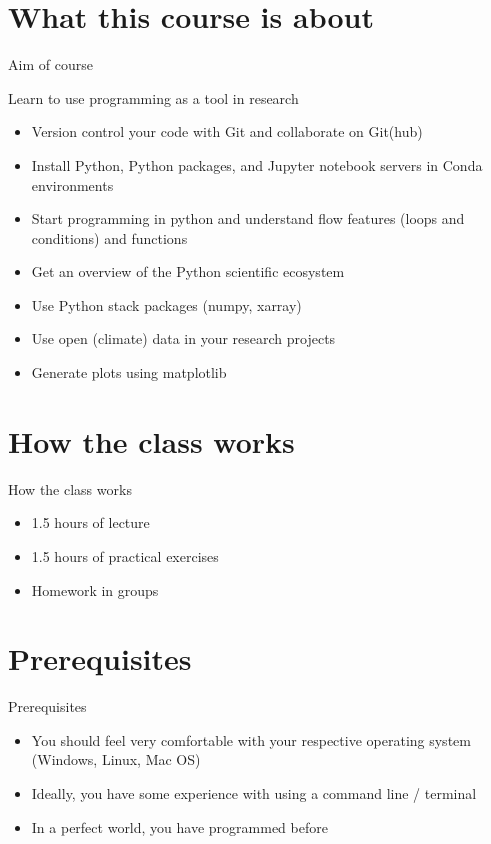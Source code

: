 \documentclass[10pt,color=usenames,dvipsnames]{beamer}
\begin{document}
\section{What this course is about}

\begin{frame}{Aim of course}
	
	Learn to use programming as a tool in research
	
	\begin{itemize}
		\item Version control your code with Git and collaborate on Git(hub)
		\item Install Python, Python packages, and Jupyter notebook servers in Conda environments
		\item Start programming in python and understand flow features (loops and conditions) and functions
		\item Get an overview of the Python scientific ecosystem
		\item Use Python stack packages (numpy, xarray)
		\item Use open (climate) data in your research projects
		\item Generate plots using matplotlib
	\end{itemize}
	
\end{frame}

\section{How the class works}

\begin{frame}{How the class works}
	
	\begin{itemize}
		\item 1.5 hours of lecture
		\item 1.5 hours of practical exercises
		\item Homework in groups
	\end{itemize}	

\end{frame}

\section{Prerequisites}

\begin{frame}{Prerequisites}
	
	\begin{itemize}
		\item You should feel very comfortable with your respective operating system (Windows, Linux, Mac OS)
		\item Ideally, you have some experience with using a command line / terminal
		\item In a perfect world, you have programmed before
	\end{itemize}
	
\end{frame}
\end{document}
